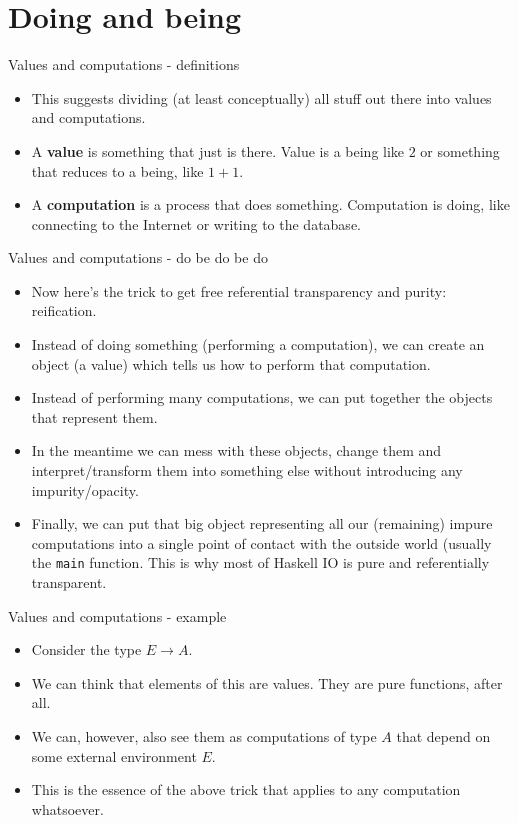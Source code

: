 \documentclass{beamer}
\begin{document}
\section{Doing and being}

\begin{frame}{Values and computations - definitions}
\begin{itemize}
	\item This suggests dividing (at least conceptually) all stuff out there into values and computations.
	\item A \textbf{value} is something that just is there. Value is a being like $2$ or something that reduces to a being, like $1 + 1$.
	\item A \textbf{computation} is a process that does something. Computation is doing, like connecting to the Internet or writing to the database.
\end{itemize}
\end{frame}

\begin{frame}{Values and computations - do be do be do}
\begin{itemize}
	\item Now here's the trick to get free referential transparency and purity: reification.
	\item Instead of doing something (performing a computation), we can create an object (a value) which tells us how to perform that computation.
	\item Instead of performing many computations, we can put together the objects that represent them.
	\item In the meantime we can mess with these objects, change them and interpret/transform them into something else without introducing any impurity/opacity.
	\item Finally, we can put that big object representing all our (remaining) impure computations into a single point of contact with the outside world (usually the \texttt{main} function. This is why most of Haskell IO is pure and referentially transparent.
\end{itemize}
\end{frame}

\begin{frame}{Values and computations - example}
\begin{itemize}
	\item Consider the type $E \to A$.
	\item We can think that elements of this are values. They are pure functions, after all.
	\item We can, however, also see them as computations of type $A$ that depend on some external environment $E$.
	\item This is the essence of the above trick that applies to any computation whatsoever.
\end{itemize}
\end{frame}
\end{document}
